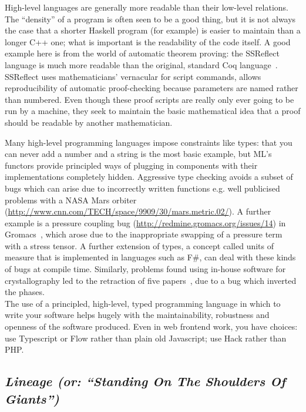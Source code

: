 \documentclass[a4paper,11pt]{article}
\begin{document}
High-level languages are generally more readable than their low-level
relations. The ``density'' of a program is often seen to be a good
thing, but it is not always the case that a shorter Haskell program
(for example) is easier to maintain than a longer C++ one; what is
important is the readability of the code itself. A good example here
is from the world of automatic theorem proving: the SSReflect language
is much more readable than the original, standard Coq
language~\cite{GonthierZND13}. SSReflect uses mathematicians'
vernacular for script commands, allows reproducibility of automatic
proof-checking because parameters are named rather than numbered.
Even though these proof scripts are really only ever going to be run
by a machine, they seek to maintain the basic mathematical idea that a
proof should be readable by another mathematician.

Many high-level programming languages impose constraints like types: that
you can never add a number and a string is the most basic example, but
ML's functors provide principled ways of plugging in components with
their implementations completely hidden. Aggressive type checking
avoids a subset of bugs which can arise due to incorrectly written
functions e.g. well publicised problems with a NASA Mars
orbiter (\url{http://www.cnn.com/TECH/space/9909/30/mars.metric.02/}).
A further example is a pressure coupling
bug (\url{http://redmine.gromacs.org/issues/14}) in
Gromacs~\cite{Hess2008}, which arose due to the inappropriate swapping
of a pressure term with a stress tensor.  A further extension of
types, a concept called units of measure that is implemented in
languages such as F\#, can deal with these kinds of bugs at compile
time. Similarly, problems found using in-house software for
crystallography led to the retraction of five
papers~\cite{Miller2006}, due to a bug which inverted the phases.\\

 The use of a
principled, high-level, typed programming language in which to write
your software helps hugely with the maintainability, robustness and
openness of the software produced. Even in web frontend work, you have
choices: use Typescript or Flow rather than plain old Javascript; use
Hack rather than PHP.

\subsection{{\emph{Lineage (or: ``Standing On The Shoulders Of Giants'')}}}
\end{document}
